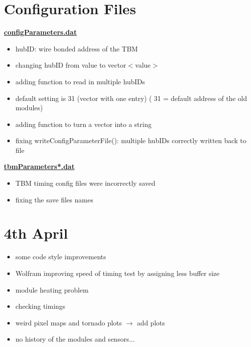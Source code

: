 \documentclass[9pt]{beamer}
\begin{document}
\section{Configuration Files}
\begin{frame}
	\underline{\textbf{configParameters.dat}}
	\begin{itemize}
		\setlength{\itemsep}{\fill}
		\item hubID: wire bonded address of the TBM
		\item changing hubID from value to vector$<$value$>$
		\item adding function to read in multiple hubIDs
		\item default setting is {31} (vector with one entry) ( 31 = default address of the old modules)
		\item adding function to turn a vector into a string
		\item fixing writeConfigParameterFile(): multiple hubIDs correctly written back to file
	\end{itemize}
	\vspace*{.7cm}
	\underline{\textbf{tbmParameters*.dat}}
	\begin{itemize}
		\setlength{\itemsep}{\fill}
		\item TBM timing config files were incorrectly saved
		\item fixing the save files names 
	\end{itemize}
\end{frame}
\section{4th April}
\begin{frame}
	\begin{itemize}
		\setlength{\itemsep}{\fill}
		\item some code style improvements
		\item Wolfram improving speed of timing test by assigning less buffer size
		\item module heating problem
		\item checking timings
		\item weird pixel maps and tornado plots $\rightarrow$ add plots
		\item no history of the modules and sensors...
	\end{itemize}
\end{frame}
\end{document}
